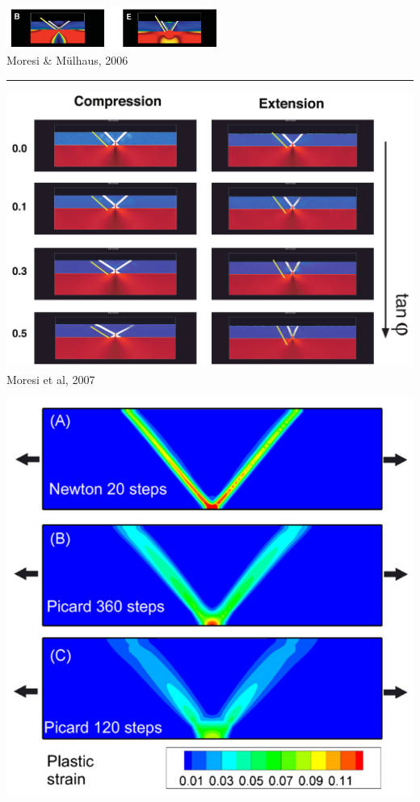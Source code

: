 \begin{center}
\includegraphics[width=7cm]{images/benchmark_brick/momu06}\\
{\captionfont Moresi \& M{\"u}lhaus, 2006 \cite{momu06}}
\end{center}

\begin{center}\noindent\rule{8cm}{0.4pt}\end{center}

\begin{center}
\begin{minipage}{0.45\textwidth}
\centering
\includegraphics[height=0.8\textwidth]{images/benchmark_brick/moml07}\\
{\captionfont Moresi et al, 2007 \cite{moml07}}
\end{minipage}\hfill
\begin{minipage}{0.45\textwidth}
\centering
\includegraphics[height=0.8\textwidth]{images/benchmark_brick/poso08}\\

\end{minipage}
\end{center}
